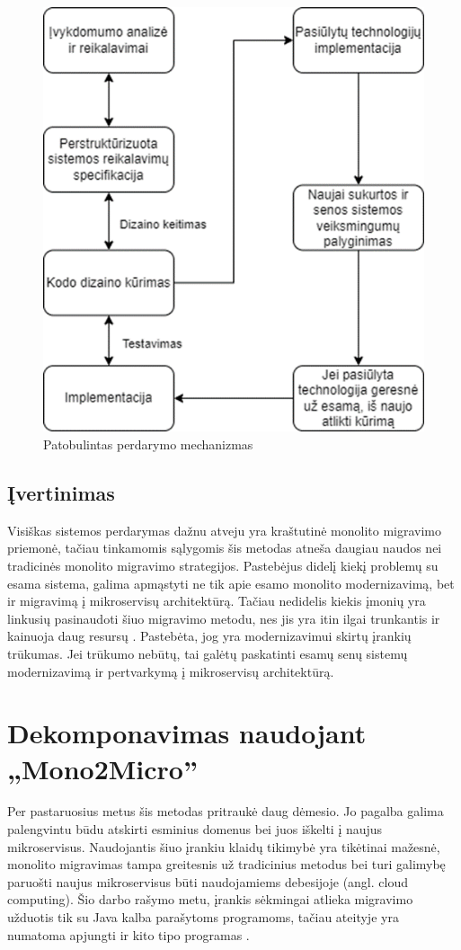 \documentclass[fleqn]{VUMIFPSkursinis}
\begin{document}
\begin{figure}[H]
    \centering
    \includegraphics{img/patobulintas-perdarymas.png}
    \caption{Patobulintas perdarymo mechanizmas \cite{MQO18}}
    \label{img:patobulintas-perdarymas}
\end{figure}

\subsection{Įvertinimas}
Visiškas sistemos perdarymas dažnu atveju yra kraštutinė monolito migravimo priemonė, tačiau tinkamomis sąlygomis šis metodas atneša daugiau naudos nei tradicinės monolito migravimo strategijos. Pastebėjus didelį kiekį problemų su esama sistema, galima apmąstyti ne tik apie esamo monolito modernizavimą, bet ir migravimą į mikroservisų architektūrą. Tačiau nedidelis kiekis įmonių yra linkusių pasinaudoti šiuo migravimo metodu, nes jis yra itin ilgai trunkantis ir kainuoja daug resursų \cite{MQO18}. Pastebėta, jog yra modernizavimui skirtų įrankių trūkumas. Jei trūkumo nebūtų, tai galėtų paskatinti esamų senų sistemų modernizavimą ir pertvarkymą į mikroservisų architektūrą.

\section{Dekomponavimas naudojant „Mono2Micro”}
Per pastaruosius metus šis metodas pritraukė daug dėmesio. Jo pagalba galima palengvintu būdu atskirti esminius domenus bei juos iškelti į naujus mikroservisus. Naudojantis šiuo įrankiu klaidų tikimybė yra tikėtinai mažesnė, monolito migravimas tampa greitesnis už tradicinius metodus bei turi galimybę paruošti naujus mikroservisus būti naudojamiems debesijoje (angl. cloud computing). Šio darbo rašymo metu, įrankis sėkmingai atlieka migravimo užduotis tik su Java kalba parašytoms programoms, tačiau ateityje yra numatoma apjungti ir kito tipo programas \cite{KXL+20}.
\end{document}
